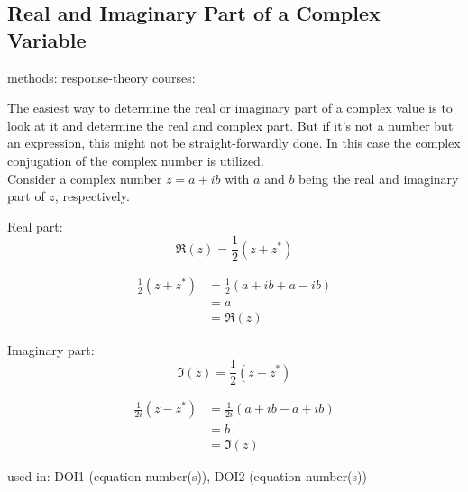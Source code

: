 \subsection{Real and Imaginary Part of a Complex Variable}

methods: {response-theory}
courses: {}

The easiest way to determine the real or imaginary part of a complex
value is to
look at it and determine the real and complex part. But if it's
not a number but an expression, this might not be straight-forwardly done.
In this case the complex conjugation of the complex number is utilized.\\

Consider a complex number $z = a +ib$ with $a$ and $b$ being the real and
imaginary part of $z$, respectively.

Real part:
\begin{equation}
 \Re(z) = \frac12 (z + z^*)
\end{equation}

\begin{align}
 \frac12 (z + z^*) &= \frac12 (a + ib + a - ib)\\
                   &= a\\
                   &= \Re(z)
\end{align}

Imaginary part:
\begin{equation}
 \Im(z) = \frac12 (z - z^*)
\end{equation}

\begin{align}
 \frac1{2i} (z - z^*) &= \frac1{2i} (a + ib - a + ib)\\
                      &= b\\
                      &= \Im(z)
\end{align}

used in: {DOI1 (equation number(s)), DOI2 (equation number(s))}
